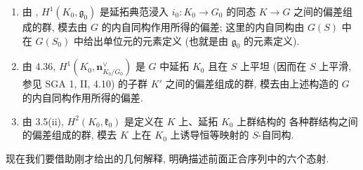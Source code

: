 \begin{enumerate}
\item[\textbf{e)}]
由 ,
\(H^1(K_0,\mathfrak g_0)\) 是延拓典范浸入 \(i_0:K_0\to G_0\)
的同态 \(K\to G\) 之间的偏差组成的群,
模去由 \(G\) 的内自同构作用所得的偏差;
这里的内自同构由 \(G(S)\) 中在 \(G(S_0)\) 中给出单位元的元素定义
(也就是由 \(\mathfrak g_0\) 的元素定义).

\item[\textbf{f)}]
由 4.36, \(H^1(K_0,\mathbf n^{\vee}_{K_0/G_0})\) 是 \(G\) 中延拓 \(K_0\)
且在 \(S\) 上平坦 (因而在 \(S\) 上平滑, 参见 SGA 1, II, 4.10)
的子群 \(K'\) 之间的偏差组成的群,
模去由上述构造的 \(G\) 的内自同构作用所得的偏差.

\item[\textbf{g)}]
由 3.5(ii), \(H^2(K_0,\mathfrak k_0)\) 是定义在 \(K\) 上、延拓 \(K_0\) 上群结构的
各种群结构之间的偏差组成的群,
模去 \(K\) 上在 \(K_0\) 上诱导恒等映射的 \(S\)-自同构.
\end{enumerate}

现在我们要借助刚才给出的几何解释, 明确描述前面正合序列中的六个态射.

